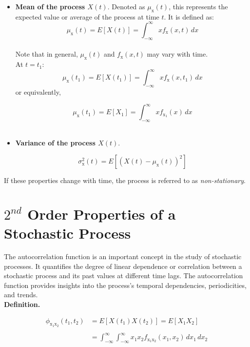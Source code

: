 \documentclass[12pt]{book}
\theoremstyle{definition}
\begin{document}
\begin{itemize}
  \item \textbf{Mean of the process \(X(t)\)}. Denoted as $\mu_\mathrm{x}(t)$, this represents the expected value or average of the process at time $t$. It is defined as:
  \[
  \mu_\mathrm{x}(t) = E[X(t)] = \int_{-\infty}^{\infty} xf_\mathrm{x}(x, t) \, dx
  \]\\

  Note that in general, \(\mu_\mathrm{x}(t)\) and \(f_\mathrm{x}(x, t)\) may vary with time. \\

  At \(t=t_1\):
 \[
  \mu_\mathrm{x}(t_1) = E[X(t_1)] = \int_{-\infty}^{\infty} xf_\mathrm{x}(x, t_1) \, dx
  \]
  or equivalently,
  
  \[
  \mu_\mathrm{x}(t_1) = E[X_1] = \int_{-\infty}^{\infty} x f_\mathrm{x_1}(x) \, dx
  \]
  \\


  \item \textbf{Variance of the process \(X(t)\)}. 

  \[\sigma_\mathrm{x}^2(t) = E\left [\left(X(t)-\mu_\mathrm{x}(t) \right)^2 \right ]
  \]
  
\end{itemize}

If these properties change with time, the process is
referred to as \emph{non-stationary}.

\section{\(2^{nd}\) Order Properties of a Stochastic Process}

The autocorrelation function is an important concept in the study of stochastic processes. It quantifies the degree of linear dependence or correlation between a stochastic process and its past values at different time lags. The autocorrelation function provides insights into the process's temporal dependencies, periodicities, and trends. \\

\textbf{Definition.} 

\[
\begin{split}
    \phi_\mathrm{x_1 x_2}(t_1,t_2) & = E\left [ X(t_1) X(t_2) \right ] = E[X_1 X_2]\\
    \\
    & = \int_{-\infty}^{\infty}\int_{-\infty}^{\infty}x_1x_2f_\mathrm{x_1 x_2}(x_1,x_2) \, dx_1 \, dx_2
\end{split}
\]
\end{document}
